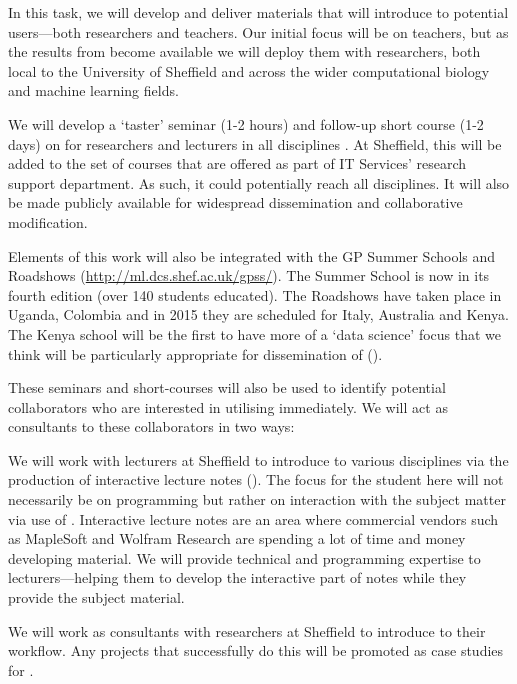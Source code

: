 \begin{workpackage}
\begin{tasklist}
\begin{task}[title=Introduce \TheProject to Researchers and Teachers, id=project-intro,lead=USH,PM=14]
\begin{task}[title=Introduce \TheProject to Researchers and Teachers, id=project-intro,lead=USH,PM=20,partners={USO}]
  In this task, we will develop and deliver materials that will
  introduce \TheProject to potential users---both researchers and
  teachers. Our initial focus will be on teachers, but as the results
  from  become available we will deploy them with
  researchers, both local to the University of Sheffield and across
  the wider computational biology and machine learning fields.

  We will develop a `taster' seminar (1-2 hours) and follow-up short course
  (1-2 days) on \TheProject for researchers and lecturers in all
  disciplines . At Sheffield, this will
  be added to the set of courses that are offered as part of IT
  Services' research support department. As such, it could potentially
  reach all disciplines. It will also be made publicly available for
  widespread dissemination and collaborative modification.

  Elements of this work will also be integrated with the GP Summer
  Schools and Roadshows (\url{http://ml.dcs.shef.ac.uk/gpss/}). The
  Summer School is now in its fourth edition (over 140 students
  educated). The Roadshows have taken place in Uganda, Colombia and in
  2015 they are scheduled for Italy, Australia and Kenya. The Kenya
  school will be the first to have more of a `data science' focus that
  we think will be particularly appropriate for dissemination of
  \TheProject ().

  These seminars and short-courses will also be used to identify
  potential collaborators who are interested in utilising \TheProject
  immediately. We will act as consultants to these collaborators in
  two ways:

  We will work with lecturers at Sheffield to introduce \TheProject to
  various disciplines via the production of interactive lecture notes
  (). The focus for the student here
  will not necessarily be on programming but rather on interaction
  with the subject matter via use of \TheProject. Interactive lecture
  notes are an area where commercial vendors such as MapleSoft and
  Wolfram Research are spending a lot of time and money developing
  material. We will provide technical and programming expertise to
  lecturers---helping them to develop the interactive part of notes
  while they provide the subject material.

  We will work as consultants with researchers at Sheffield to
  introduce \TheProject to their workflow. Any projects that
  successfully do this will be promoted as case studies for
  \TheProject.


\end{task}
\end{task}
\end{tasklist}
\end{workpackage}
